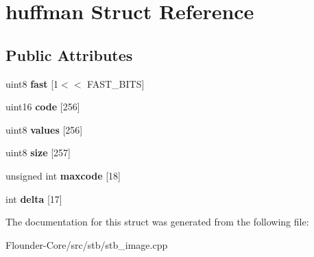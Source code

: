 \hypertarget{structhuffman}{}\section{huffman Struct Reference}
\label{structhuffman}
\subsection*{Public Attributes}
\begin{DoxyCompactItemize}
\item 
\mbox{\label{structhuffman_a9dbb29a8ed724a32f502d9595510ddc2}} 
uint8 {\bfseries fast} \mbox{[}1$<$$<$ F\+A\+S\+T\+\_\+\+B\+I\+TS\mbox{]}
\item 
\mbox{\label{structhuffman_a9925018a95d5a2122cd732561fa0fa64}} 
uint16 {\bfseries code} \mbox{[}256\mbox{]}
\item 
\mbox{\label{structhuffman_a313d78cf23f40b314c25681ff2a6224b}} 
uint8 {\bfseries values} \mbox{[}256\mbox{]}
\item 
\mbox{\label{structhuffman_afdb0fbcf25aec42ba30b0d0e2453a057}} 
uint8 {\bfseries size} \mbox{[}257\mbox{]}
\item 
\mbox{\label{structhuffman_aeb78aca6c7377faaad8123566d54fc98}} 
unsigned int {\bfseries maxcode} \mbox{[}18\mbox{]}
\item 
\mbox{\label{structhuffman_a04255e3e1c6de74d36a08a1aa4e9537d}} 
int {\bfseries delta} \mbox{[}17\mbox{]}
\end{DoxyCompactItemize}


The documentation for this struct was generated from the following file\+:\begin{DoxyCompactItemize}
\item 
Flounder-\/\+Core/src/stb/stb\+\_\+image.\+cpp\end{DoxyCompactItemize}
